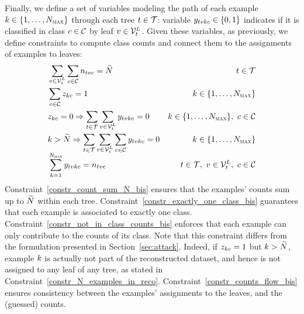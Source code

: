 Finally, we define a set of variables modeling the path of each example $k \in \{1,\dots,N_{\textsc{max}}\}$ through each tree $t \in \mathcal{T}$: variable $\varyb[\tree,\node,\example,\class] \in \{0,1\}$ indicates if it is classified in class $c \in \mathcal{C}$ by leaf $\node \in \leaves[\tree]$.
Given these variables, as previously, we define constraints to compute class counts and connect them to the assignments of examples to leaves:
\begin{align}
    &\sum\limits_{\node \in \leaves[\tree]} \sum\limits_{\class \in \classes} \nodesupport[\tree,\node,\class] = \widetilde{\nexamples} &\tree \in \forest \label{constr_count_sum_N_bis}\\
     &\sum\limits_{\class \in \classes}\varz[\example,\class]=1 &\example \in \{1,\dots,\nexamples_{\textsc{max}}\}\label{constr_exactly_one_class_bis}\\
    &\varz[\example,\class] = 0 \Rightarrow\sum\limits_{\tree \in \forest} \sum\limits_{\node \in \leaves[\tree]} \varyb[\tree,\node,\example,\class] = 0 &\example \in \{1,\dots,\nexamples_{\textsc{max}}\},~\class \in \classes\label{constr_not_in_class_counts_bis}\\
    &\example > \widetilde{\nexamples}  \Rightarrow\sum\limits_{\tree \in \forest} \sum\limits_{\node \in \leaves[\tree]}\sum\limits_{\class \in \classes} \varyb[\tree,\node,\example,\class] = 0 &\example \in \{1,\dots,\nexamples_{\textsc{max}}\}\label{constr_N_examples_in_reco}\\
    & \sum_{\example=1}^{\smash{\nexamples_{\textsc{max}}}} \varyb[\tree,\node,\example,\class] =\nodesupport[\tree,\node,\class] &\tree \in \forest,~\node \in \leaves[\tree],~\class \in \classes\label{constr_counts_flow_bis}
\end{align}
Constraint~\eqref{constr_count_sum_N_bis} ensures that the examples' counts sum up to $\widetilde{N}$ within each tree. Constraint~\eqref{constr_exactly_one_class_bis} guarantees that each example is associated to exactly one class. Constraint~\eqref{constr_not_in_class_counts_bis} enforces that each example can only contribute to the counts of its class. Note that this constraint differs from the formulation presented in Section~\ref{sec:attack}. Indeed, if $\varz[\example,\class] = 1$ but $k > \widetilde{N}$, example $k$ is actually not part of the reconstructed dataset, and hence is not assigned to any leaf of any tree, as stated in Constraint~\eqref{constr_N_examples_in_reco}.
Constraint~\eqref{constr_counts_flow_bis} ensures consistency between the examples' assignments to the leaves, and the (guessed) counts.

